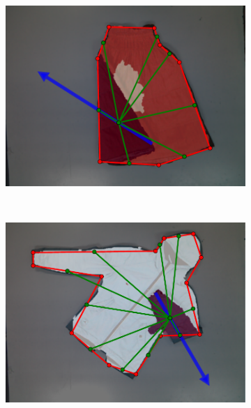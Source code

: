 \begin{figure}[htbp]
\begin{subfigure}[l]{\bigtablewidth}
	    \centering
    	\includegraphics[width=\textwidth]
    	{figures/results/skirt7-pnp.pdf}
	\end{subfigure}
	~
    \begin{subfigure}[r]{\bigtablewidth}
	    \centering
    	\includegraphics[width=\textwidth]
    	{figures/results/jacket2-pnp.pdf}
	\end{subfigure}
	~
    \begin{subfigure}[l]{\bigtablewidth}
	    \centering

\end{subfigure}
\end{figure}

